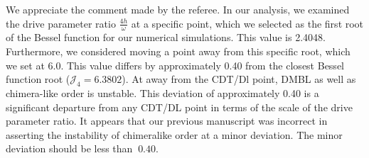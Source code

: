 \documentclass[aps,prb,reprint,showpacs,floatfix,superscriptaddress, onecolumn, nofootinbib, 10pt]{revtex4-2}
\newcommand{\response}[1]{{\color{black}#1}} %
\begin{document}
\begin{enumerate}
\begin{enumerate}
\begin{enumerate}
			\response{We appreciate the comment made by the referee. In our analysis, we examined the drive parameter ratio $\frac{4h}{\omega}$ at a specific point, which we selected as the first root of the Bessel function for our numerical simulations. This value is 2.4048. Furthermore, we considered moving a point away from this specific root, which we set at 6.0. This value differs by approximately 0.40 from the closest Bessel function root ($\mathcal{J}_4 =6.3802$). At away from the CDT/Dl point, DMBL as well as chimera-like order is unstable. This deviation of approximately 0.40 is a significant departure from any CDT/DL point in terms of the scale of the drive parameter ratio. It appears that our previous manuscript was incorrect in asserting the instability of chimeralike order at a minor deviation. The minor deviation should be less than $~0.40$. \\
				
}
\end{enumerate}
\end{enumerate}
\end{enumerate}
\end{document}
